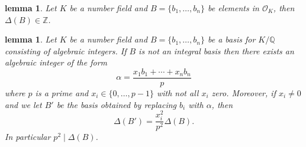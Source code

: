 \documentclass[11pt,a4paper]{amsart}
\theoremstyle{plain}
\newtheorem{lemma}[subsection]{lemma}
\theoremstyle{definition}
\theoremstyle{definition}
\newcommand{\ZZ}{\mathbb{Z}}
\def\QQ{\mathbb{Q}}
\def \a{\alpha}
\def \OO {\mathcal{O}}
\begin{document}
	\begin{lemma}\label{lemma: int basis int disc}
		Let $K$ be a number field and $B=\{b_1,\dots,b_n\}$ be elements in $\OO_K$, then $\Delta(B) \in \ZZ$.
	\end{lemma}	
	
	\begin{lemma}\label{lemma: disc int basis}
		Let $K$ be a number field and $B=\{b_1,\dots,b_n\}$ be a basis for $K/\QQ$ consisting of algebraic integers. If $B$ is not an integral basis then there exists an algebraic integer of the form \[\a=\frac{x_1b_1+\cdots+x_nb_n}{p}\] where $p$ is a prime and $x_i \in \{0,\dots,p-1\}$ with not all $x_i$ zero. Moreover, if $x_i \neq 0$ and we let $B'$ be the basis obtained by replacing $b_i$ with $\a$, then \[\Delta(B')= \frac{x_i^2}{p^2} \Delta(B).\] In particular $p^2 \mid \Delta(B)$.
	\end{lemma} 
	
\end{document}
